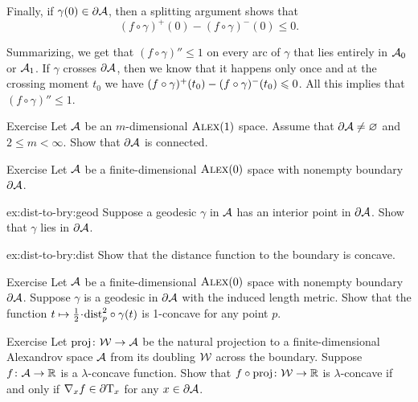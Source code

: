 Finally, if $\gamma(0)\in\partial\mathcal{A}$, then a splitting argument shows that
\[(f\circ\gamma)^+(0)-(f\circ\gamma)^-(0)\le 0.\]

Summarizing, we get that $(f\circ\gamma)''\le 1$ on every arc of $\gamma$ that lies entirely in $\mathcal{A}_0$ or $\mathcal{A}_1$.
If $\gamma$ crosses $\partial \mathcal{A}$, then we know that it happens only once and at the crossing moment $t_0$ 
we have $(f\circ\gamma)^+(t_0)\z-(f\circ\gamma)^-(t_0)\z\le 0$.
All this implies that $(f\circ\gamma)''\le 1$.
\qeds

\begin{thm}[!]{Exercise}\label{ex:bry-connected}
Let $\mathcal{A}$ be an $m$-dimensional $\textup{\textsc{Alex}}(1)$ space.
Assume that $\partial\mathcal{A}\ne \varnothing$ and $2\le m<\infty$.
Show that $\partial\mathcal{A}$ is connected.
\end{thm}



\begin{thm}{Exercise}\label{ex:dist-to-bry}
Let $\mathcal{A}$ be a finite-dimensional $\textup{\textsc{Alex}}(0)$ space with nonempty boundary $\partial\mathcal{A}$.

\begin{subthm}{ex:dist-to-bry:geod}
Suppose a geodesic $\gamma$ in $\mathcal{A}$ has an interior point in $\partial\mathcal{A}$.
Show that $\gamma$ lies in $\partial\mathcal{A}$.
\end{subthm}


\begin{subthm}{ex:dist-to-bry:dist}
Show that the distance function to the boundary is concave.
\end{subthm}

\end{thm}

\begin{thm}[!]{Exercise}\label{ex:liberman}
Let $\mathcal{A}$ be a finite-dimensional $\textup{\textsc{Alex}}(0)$ space with nonempty boundary $\partial\mathcal{A}$.
Suppose $\gamma$ is a geodesic in $\partial\mathcal{A}$ with the induced length metric.
Show that the function $t\mapsto \tfrac12\cdot\distfun_p^2\circ\gamma(t)$ is 1-concave for any point $p$. 
\end{thm}

\begin{thm}{Exercise}\label{ex:native}
Let $\operatorname{\rm proj}\nolimits\colon\mathcal{W}\to\mathcal{A}$ be the natural projection to a finite-dimensional Alexandrov space $\mathcal{A}$ from its doubling $\mathcal{W}$ across the boundary.
Suppose $f\colon\mathcal{A}\to\mathbb{R}$ is a $\lambda$-concave function.
Show that $f\circ\operatorname{\rm proj}\nolimits\colon\mathcal{W}\to\mathbb{R}$ is $\lambda$-concave if and only if $\nabla_xf\in \partial \mathrm{T}_x$ 
for any $x\in\partial \mathcal{A}$.
\end{thm}

